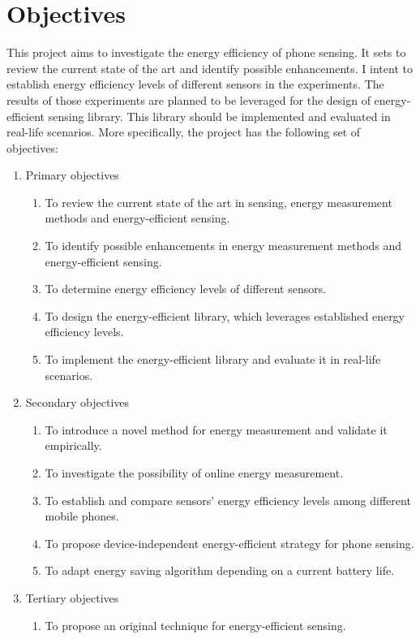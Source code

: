 \section{Objectives}
\label{s:objectives}
\hspace{10pt} This project aims to investigate the energy efficiency of phone sensing. It sets to review the current state of the art and identify possible enhancements. I intent to establish energy efficiency levels of different sensors in the experiments. The results of those experiments are planned to be leveraged for the design of energy-efficient sensing library. This library should be implemented and evaluated in real-life scenarios. More specifically, the project has the following set of objectives: 

\begin{enumerate}
 \item Primary objectives
  \begin{enumerate}
  	\item To review the current state of the art in sensing, energy measurement methods and energy-efficient sensing.
  	\item To identify possible enhancements in energy measurement methods and energy-efficient sensing.
  	\item To determine energy efficiency levels of different sensors.
  	\item To design the energy-efficient library, which leverages established energy efficiency levels.
  	\item To implement the energy-efficient library and evaluate it in real-life scenarios.
  \end{enumerate}
  \item Secondary objectives
  \begin{enumerate}
    \item To introduce a novel method for energy measurement and validate it empirically.
    \item To investigate the possibility of online energy measurement.
    \item To establish and compare sensors' energy efficiency levels among different mobile phones.
  	\item To propose device-independent energy-efficient strategy for phone sensing.
  	\item To adapt energy saving algorithm depending on a current battery life.
  \end{enumerate}
  \item Tertiary objectives
  \begin{enumerate}
   \item To propose an original technique for energy-efficient sensing.
  \end{enumerate}
\end{enumerate}